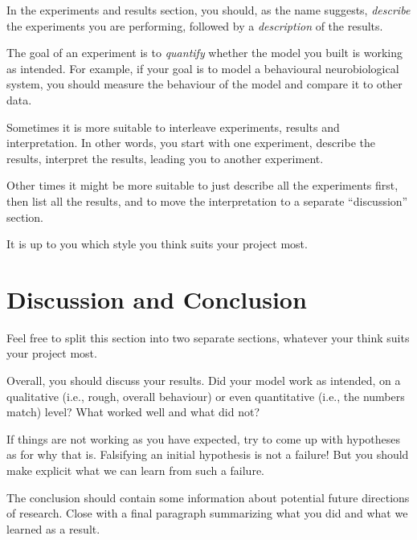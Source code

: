 \documentclass[12pt,letterpaper,oneside]{article}
\begin{document}
	In the experiments and results section, you should, as the name suggests, \emph{describe} the experiments you are performing, followed by a \emph{description} of the results.

	The goal of an experiment is to \emph{quantify} whether the model you built is working as intended. For example, if your goal is to model a behavioural neurobiological system, you should measure the behaviour of the model and compare it to other data.

	Sometimes it is more suitable to interleave experiments, results and interpretation. In other words, you start with one experiment, describe the results, interpret the results, leading you to another experiment.

	Other times it might be more suitable to just describe all the experiments first, then list all the results, and to move the interpretation to a separate \enquote{discussion} section.

	It is up to you which style you think suits your project most.

	\section{Discussion and Conclusion}

	Feel free to split this section into two separate sections, whatever your think suits your project most.

	Overall, you should discuss your results. Did your model work as intended, on a qualitative (i.e., rough, overall behaviour) or even quantitative (i.e., the numbers match) level? What worked well and what did not?
	
	If things are not working as you have expected, try to come up with hypotheses as for why that is. Falsifying an initial hypothesis is not a failure! But you should make explicit what we can learn from such a failure.

	The conclusion should contain some information about potential future directions of research. Close with a final paragraph summarizing what you did and what we learned as a result.

	\newpage
	\printbibliography
\end{document}

